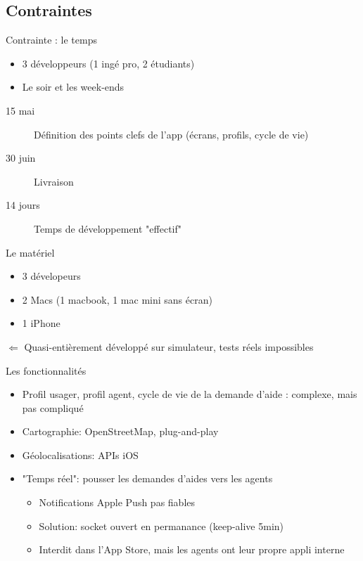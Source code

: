 \documentclass{beamer}
\begin{document}
\subsection{Contraintes}
\begin{frame}{Contrainte : le temps}
    \begin{itemize}
        \item 3 développeurs (1 ingé pro, 2 étudiants)
        \item Le soir et les week-ends
    \end{itemize}
    \begin{description}
        \item[15 mai] Définition des points clefs de l'app (écrans, profils, cycle de vie)
        \item[30 juin] Livraison
        \item[14 jours] Temps de développement "effectif"
    \end{description}
\end{frame}
\begin{frame}{Le matériel}
	\begin{itemize}
		\item 3 dévelopeurs
		\item 2 Macs (1 macbook, 1 mac mini sans écran)
		\item 1 iPhone
	\end{itemize}

	$\Leftarrow$ Quasi-entièrement développé sur simulateur, tests réels impossibles
\end{frame}
\begin{frame}{Les fonctionnalités}
    \begin{itemize}
        \item Profil usager, profil agent, cycle de vie de la demande d'aide : complexe, mais pas compliqué
        \item Cartographie: OpenStreetMap, plug-and-play
        \item Géolocalisations: APIs iOS
        \item "Temps réel": pousser les demandes d'aides vers les agents
            \begin{itemize}
                \item Notifications Apple Push pas fiables
                \item Solution: socket ouvert en permanance (keep-alive 5min)
                \item Interdit dans l'App Store, mais les agents ont leur propre appli interne
            \end{itemize}
    \end{itemize}
\end{frame}
\end{document}
